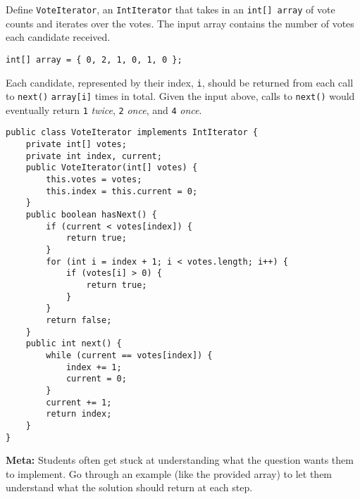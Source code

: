 \begin{blocksection}
\question Define \lstinline$VoteIterator$, an \lstinline$IntIterator$ that
takes in an \lstinline$int[] array$ of vote counts and iterates over the votes.
The input array contains the number of votes each candidate received.

\begin{lstlisting}
int[] array = { 0, 2, 1, 0, 1, 0 };
\end{lstlisting}

Each candidate, represented by their index, \lstinline$i$, should be returned
from each call to \lstinline$next()$ \lstinline$array[i]$ times in total. Given
the input above, calls to \lstinline$next()$ would eventually return
\lstinline$1$ \textit{twice}, \lstinline$2$ \textit{once}, and \lstinline$4$
\textit{once}.

\begin{solution}[3in]
\begin{lstlisting}
public class VoteIterator implements IntIterator {
    private int[] votes;
    private int index, current;
    public VoteIterator(int[] votes) {
        this.votes = votes;
        this.index = this.current = 0;
    }
    public boolean hasNext() {
        if (current < votes[index]) {
            return true;
        }
        for (int i = index + 1; i < votes.length; i++) {
            if (votes[i] > 0) {
                return true;
            }
        }
        return false;
    }
    public int next() {
        while (current == votes[index]) {
            index += 1;
            current = 0;
        }
        current += 1;
        return index;
    }
}
\end{lstlisting}
\end{solution}
\end{blocksection}

\begin{solution}
\textbf{Meta:} Students often get stuck at understanding what the question
wants them to implement. Go through an example (like the provided array) to let
them understand what the solution should return at each step.
\end{solution}
